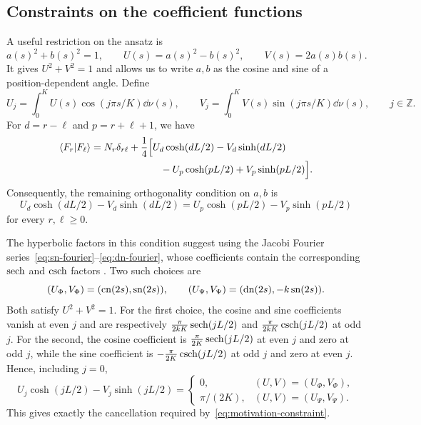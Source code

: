 \subsection{Constraints on the coefficient functions}
A useful restriction on the ansatz is
\begin{equation}
  a(s)^2+b(s)^2=1,\qquad
  U(s)=a(s)^2-b(s)^2,\qquad V(s)=2a(s)b(s).
  \label{eq:motivation-circle}
\end{equation}
It gives $U^2+V^2=1$ and allows us to write
$a,b$ as the cosine and sine of a position-dependent angle. Define
\begin{equation}
  U_j=\int_0^K U(s)\cos(j\pi s/K)\dd\nu(s),\qquad
  V_j=\int_0^K V(s)\sin(j\pi s/K)\dd\nu(s),
  \qquad j\in\mathbb Z.
\end{equation}
For
$d=r-\ell$ and $p=r+\ell+1$, we have
\begin{equation}
  \begin{aligned}
    \langle F_r|F_\ell\rangle
    &=N_r\delta_{r\ell}+\frac14\Bigl[
      U_d\cosh(dL/2)-V_d\sinh(dL/2)\\
      &\hspace{7em}-U_p\cosh(pL/2)+V_p\sinh(pL/2)\Bigr].
  \end{aligned}
  \label{eq:motivation-overlap}
\end{equation}
Consequently, the remaining orthogonality condition on $a,b$ is
\begin{equation}
  U_d\cosh(dL/2)-V_d\sinh(dL/2)
  =U_p\cosh(pL/2)-V_p\sinh(pL/2)
  \label{eq:motivation-constraint}
\end{equation}
for every $r,\ell\geq0$.

The hyperbolic factors in this condition suggest using the Jacobi Fourier
series~\eqref{eq:sn-fourier}--\eqref{eq:dn-fourier}, whose coefficients contain
the corresponding $\operatorname{sech}$ and $\operatorname{csch}$ factors \cite[\S22.11]{DLMF}. Two such
choices are
\begin{equation}
  (U_\Phi,V_\Phi)=(\operatorname{cn}(2s),\operatorname{sn}(2s)),\qquad
  (U_\Psi,V_\Psi)=(\operatorname{dn}(2s),-k\operatorname{sn}(2s)).
  \label{eq:motivation-jacobi}
\end{equation}
Both satisfy $U^2+V^2=1$. For the first choice, the cosine and sine
coefficients vanish at even $j$ and are respectively
$\frac{\pi}{2kK}\operatorname{sech}(jL/2)$ and
$\frac{\pi}{2kK}\operatorname{csch}(jL/2)$ at odd $j$. For the second, the cosine
coefficient is $\frac{\pi}{2K}\operatorname{sech}(jL/2)$ at even $j$ and zero at odd
$j$, while the sine coefficient is $-\frac{\pi}{2K}\operatorname{csch}(jL/2)$ at odd
$j$ and zero at even $j$. Hence, including $j=0$,
\begin{equation}
  U_j\cosh(jL/2)-V_j\sinh(jL/2)
  =\begin{cases}
    0,&(U,V)=(U_\Phi,V_\Phi),\\
    \pi/(2K),&(U,V)=(U_\Psi,V_\Psi).
  \end{cases}
\end{equation}
This gives exactly the cancellation required
by~\eqref{eq:motivation-constraint}.

